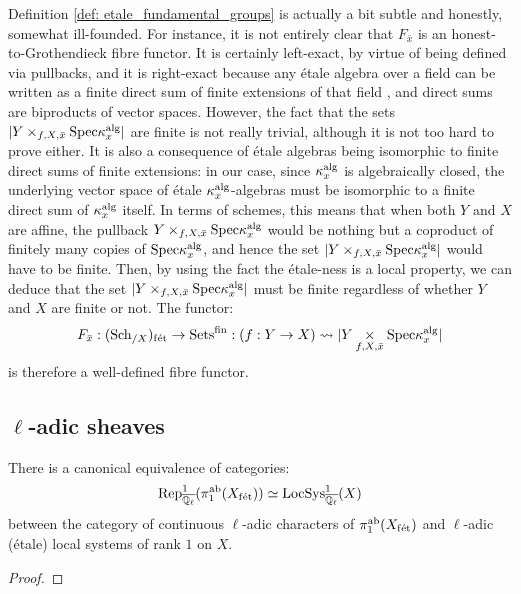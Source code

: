             \begin{remark}
                Definition \ref{def: etale_fundamental_groups} is actually a bit subtle and honestly, somewhat ill-founded. For instance, it is not entirely clear that $F_{\bar{x}}$ is an honest-to-Grothendieck fibre functor. It is certainly left-exact, by virtue of being defined via pullbacks, and it is right-exact because any \'etale algebra over a field can be written as a finite direct sum of finite extensions of that field \cite[\href{https://stacks.math.columbia.edu/tag/00U3}{Tag 00U3}]{stacks}, and direct sums are biproducts of vector spaces. However, the fact that the sets $|Y \x_{f, X, \bar{x}} \Spec \kappa_x^{\alg}|$ are finite is not really trivial, although it is not too hard to prove either. It is also a consequence of \'etale algebras being isomorphic to finite direct sums of finite extensions: in our case, since $\kappa_x^{\mathrm{alg}}$ is algebraically closed, the underlying vector space of \'etale $\kappa_x^{\mathrm{alg}}$-algebras must be isomorphic to a finite direct sum of $\kappa_x^{\mathrm{alg}}$ itself. In terms of schemes, this means that when both $Y$ and $X$ are affine, the pullback $Y \x_{f, X, \bar{x}} \Spec \kappa_x^{\alg}$ would be nothing but a coproduct of finitely many copies of $\mathrm{Spec} \kappa_x^{\mathrm{alg}}$, and hence the set $|Y \x_{f, X, \bar{x}} \Spec \kappa_x^{\alg}|$ would have to be finite. Then, by using the fact the \'etale-ness is a local property, we can deduce that the set $|Y \x_{f, X, \bar{x}} \Spec \kappa_x^{\alg}|$ must be finite regardless of whether $Y$ and $X$ are finite or not. The functor:
                    $$F_{\bar{x}}: (\Sch_{/X})_{\fet} \to \Sets^{\fin}: (f: Y \to X) \mapsto |Y \x_{f, X, \bar{x}} \Spec \kappa_x^{\alg}|$$
                is therefore a well-defined fibre functor.
            \end{remark}
        
        \subsection{\texorpdfstring{$\ell$}{}-adic sheaves}
            \begin{theorem} \label{theorem: unramified_representations_are_sheaves_on_X}
                There is a canonical equivalence of categories:
                    $$\mathrm{Rep}^1_{\overline{\mathbb{Q}_{\ell}}}(\pi_1^{\mathrm{ab}}(X_{\mathrm{f\acute{e}t}})) \simeq \mathrm{LocSys}^1_{\overline{\mathbb{Q}_{\ell}}}(X)$$
                between the category of continuous $\ell$-adic characters of $\pi_1^{\mathrm{ab}}(X_{\mathrm{f\acute{e}t}})$ and $\ell$-adic (\'etale) local systems of rank $1$ on $X$.
            \end{theorem}
                \begin{proof}
                    
                \end{proof}
            
